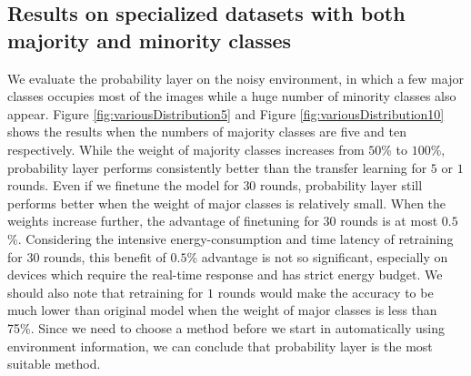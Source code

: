 \documentclass[pageno]{jpaper}
\begin{document}
\subsection{Results on specialized datasets with both majority and minority classes}
We evaluate the probability layer on the noisy environment, in which a few major classes occupies most of the images while a huge number of minority classes also appear. Figure \ref{fig:variousDistribution5} and Figure \ref{fig:variousDistribution10} shows the results when the numbers of majority classes are five and ten respectively. While the weight of majority classes increases from $50$\% to $100$\%, probability layer performs consistently better than the transfer learning for $5$ or $1$ rounds. Even if we finetune the model for $30$ rounds, probability layer still performs better when the weight of major classes is relatively small. When the weights increase further, the advantage of finetuning for $30$ rounds is at most $0.5$\%. Considering the intensive energy-consumption and time latency of retraining for $30$ rounds, this benefit of $0.5$\% advantage is not so significant, especially on devices which require the real-time response and has strict energy budget. We should also note that retraining for $1$ rounds would make the accuracy to be much lower than original model when the weight of major classes is less than 75\%. Since we need to choose a method before we start in automatically using environment information, we can conclude that probability layer is the most suitable method.
\end{document}
